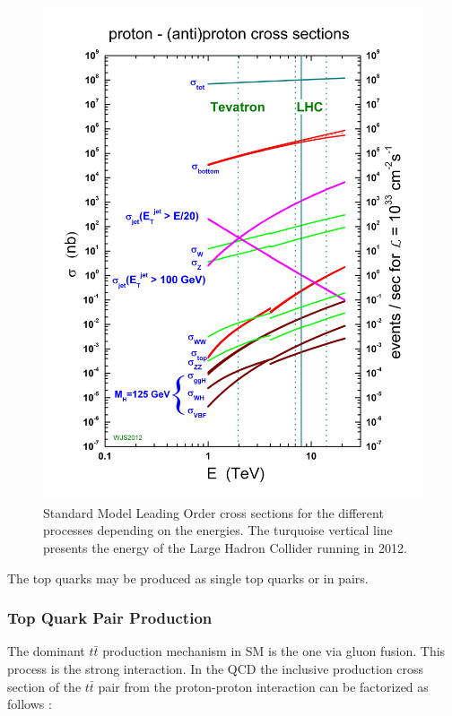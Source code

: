 \begin{figure}[p]
  \centering
  \includegraphics[width=1.0\textwidth]{01_Theory_SM/plots/crosssections2013.png}
  \caption{Standard Model Leading Order cross sections for the different processes depending on the energies. The turquoise vertical line presents the energy
  of the Large Hadron Collider running in 2012.}
  \label{fig:SM_XSec_Prod}
\end{figure}

The top quarks may be produced as single top quarks or in pairs.

\subsubsection{Top Quark Pair Production}

The dominant $t\bar{t}$ production mechanism in SM is the one via gluon fusion. This process is the strong interaction. In the QCD the inclusive production cross section of the $t\bar{t}$ pair
from the proton-proton interaction can be factorized as follows \cite{Schilling:2012dx}:

